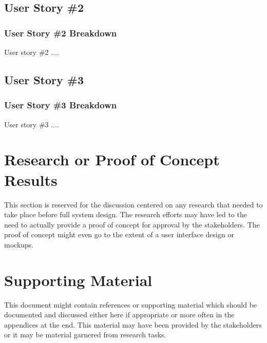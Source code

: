 \subsection{User Story \#2} 

\subsubsection{User Story \#2 Breakdown}
User story \#2  .... 

\subsection{User Story \#3} 

\subsubsection{User Story \#3 Breakdown}
User story \#3  .... 


\section{Research or Proof of Concept Results}
This section is reserved for the discussion centered on any research that needed 
to take place before full system design.  The research efforts may have led to 
the need to actually provide a proof of concept for approval by the stakeholders. 
 The proof of concept might even go to the extent of a user interface design or 
mockups. 


\section{Supporting Material}


This document might contain references or supporting material which should be documented 
and discussed  either here if appropriate or more often in the appendices at the end.  This material may have been provided by the stakeholders  
or it may be material garnered from research tasks.

